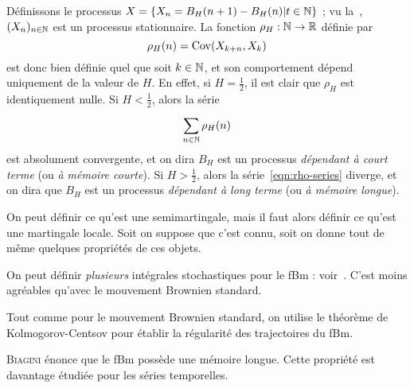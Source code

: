 Définissons le processus
$X = \left\{X_n = B_H(n+1)-B_H(n) | t\in\mathbb{N}\right\}$ ; vu
la~, $(X_n)_{n\in\mathbb{N}}$ est un
processus stationnaire. La fonction $\rho_H:\mathbb{N}\to\mathbb{R}$ définie par
\begin{equation*}
  \rho_H(n) = \operatorname{Cov}(X_{k+n}, X_k)
\end{equation*}
est donc bien définie quel que soit $k\in\mathbb{N}$, et son comportement
dépend uniquement de la valeur de $H$. En effet, si $H=\frac{1}{2}$,
il est clair que $\rho_H$ est identiquement nulle. Si $H<\frac{1}{2}$, alors la série
\begin{equation}
  \label{eqn:rho-series}
  \sum_{n\in\mathbb{N}}^{} \rho_H(n)
\end{equation}
est absolument convergente, et on dira $B_H$ est un processus
\emph{dépendant à court terme} (ou \emph{à mémoire courte}). Si
$H>\frac{1}{2}$, alors la série~\ref{eqn:rho-series} diverge, et on
dira que $B_H$ est un processus \emph{dépendant à long terme} (ou
\emph{à mémoire longue}).

\begin{prerequis}
  On peut définir ce qu'est une semimartingale, mais il faut alors
  définir ce qu'est une martingale locale. Soit on suppose que c'est
  connu, soit on donne tout de même quelques propriétés de ces objets.
\end{prerequis}

On peut définir \emph{plusieurs} intégrales stochastiques pour le fBm
: voir~\cite[Chp.~II-V]{biagini2008}. C'est moins agréables qu'avec le
mouvement Brownien standard.

Tout comme pour le mouvement Brownien standard, on utilise le théorème
de Kolmogorov-Centsov pour établir la régularité des trajectoires du
fBm.

\begin{alert}
  \textsc{Biagini} énonce que le fBm possède une mémoire longue. Cette
  propriété est davantage étudiée pour les séries temporelles.
\end{alert}